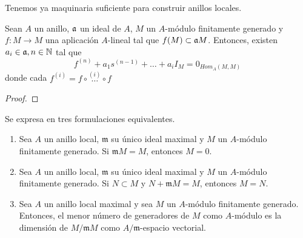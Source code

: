 \documentclass[../main.tex]{subfiles}
\begin{document}
Tenemos ya maquinaria suficiente para construir anillos locales.
\begin{theorem} Sean $A$ un anillo, $\mathfrak{a}$ un ideal de $A$, $M$ un $A$-módulo finitamente generado y $f:M\longrightarrow M$ una aplicación $A$-lineal tal que $f(M)\subset \mathfrak{a} M$. Entonces, existen $a_i\in\mathfrak{a}, n\in\mathbb{N}$ tal que $$f^{(n)}+a_1s^{(n-1)}+\dots+a_iI_M=0_{Hom_A(M,M)}$$
donde cada $f^{(i)}=f\circ\overset{(i)}{\dots}\circ f$
\end{theorem}
\begin{proof}

\end{proof}
\begin{lemma} Se expresa en tres formulaciones equivalentes.\begin{enumerate}
    \item Sea $A$ un anillo local, $\mathfrak{m}$ su único ideal maximal y $M$ un $A$-módulo finitamente generado. Si $\mathfrak{m} M=M$, entonces $M=0$.
    \item Sea $A$ un anillo local, $\mathfrak{m}$ su único ideal maximal y $M$ un $A$-módulo finitamente generado. Si $N\subset M$ y $N+\mathfrak{m}M=M$, entonces $M=N$.
    \item Sea $A$ un anillo local maximal y sea $M$ un $A$-módulo finitamente generado. Entonces, el menor número de generadores de $M$ como $A$-módulo es la dimensión de $M/\mathfrak{m}M$ como $A/\mathfrak{m}$-espacio vectorial.
\end{enumerate}

\end{lemma}
\end{document}
